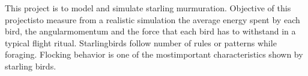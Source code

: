 This project is to model and simulate starling murmuration. Objective of this projectisto measure from a realistic simulation the average energy spent by each bird, the angularmomentum and the force that each bird has to withstand in a typical flight ritual. Starlingbirds follow number of rules or patterns while foraging. Flocking behavior is one of the mostimportant characteristics shown by starling birds. 